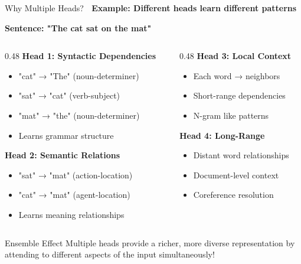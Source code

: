 \documentclass[aspectratio=169]{beamer}
\begin{document}
\begin{frame}[shrink=10]{Why Multiple Heads? 🤔}
\small
\textbf{Example: Different heads learn different patterns}

\vspace{1em}

\textbf{Sentence: "The cat sat on the mat"}

\vspace{0.5em}

\begin{columns}[T]
\begin{column}{0.48\textwidth}
\textbf{Head 1: Syntactic Dependencies}
\begin{itemize}\setlength{\itemsep}{0pt}
    \item "cat" → "The" (noun-determiner)
    \item "sat" → "cat" (verb-subject)
    \item "mat" → "the" (noun-determiner)
    \item Learns grammar structure
\end{itemize}

\vspace{0.5em}

\textbf{Head 2: Semantic Relations}
\begin{itemize}\setlength{\itemsep}{0pt}
    \item "sat" → "mat" (action-location)
    \item "cat" → "mat" (agent-location)
    \item Learns meaning relationships
\end{itemize}
\end{column}

\begin{column}{0.48\textwidth}
\textbf{Head 3: Local Context}
\begin{itemize}\setlength{\itemsep}{0pt}
    \item Each word → neighbors
    \item Short-range dependencies
    \item N-gram like patterns
\end{itemize}

\vspace{0.5em}

\textbf{Head 4: Long-Range}
\begin{itemize}\setlength{\itemsep}{0pt}
    \item Distant word relationships
    \item Document-level context
    \item Coreference resolution
\end{itemize}
\end{column}
\end{columns}

\vspace{1em}

\begin{block}{Ensemble Effect}
Multiple heads provide a richer, more diverse representation by attending to different aspects of the input simultaneously!
\end{block}
\end{frame}
\end{document}
